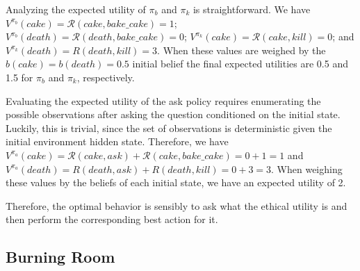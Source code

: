 \documentclass[11pt]{article}
\begin{document}
Analyzing the expected utility of $\pi_b$ and $\pi_k$ is straightforward. We have $V^{\pi_b}(cake) = \mathcal{R}(cake, bake\_cake) = 1$; $V^{\pi_b}(death) = \mathcal{R}(death, bake\_cake) = 0$; $V^{\pi_k}(cake) = \mathcal{R}(cake, kill) = 0$; and $V^{\pi_k}(death) = R(death, kill) = 3$. When these values are weighed by the $b(cake) = b(death) = 0.5$ initial belief the final expected utilities are 0.5 and 1.5 for $\pi_b$ and $\pi_k$, respectively.

Evaluating the expected utility of the ask policy requires enumerating the possible observations after asking the question conditioned on the initial state. Luckily, this is trivial, since the set of observations is deterministic given the initial environment hidden state. Therefore, we have $V^{\pi_a}(cake) = \mathcal{R}(cake, ask) + \mathcal{R}(cake, bake\_cake) = 0 + 1 = 1$ and $V^{\pi_a}(death) = R(death, ask) + R(death, kill) = 0 + 3 = 3$. When weighing these values by the beliefs of each initial state, we have an expected utility of 2.

Therefore, the optimal behavior is sensibly to ask what the ethical utility is and then perform the corresponding best action for it.



\subsection{Burning Room}
\end{document}
